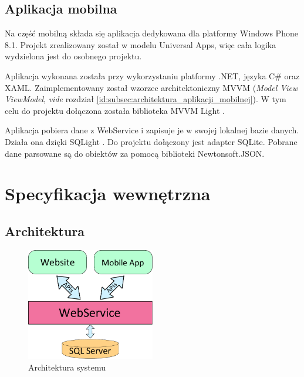 \documentclass[a4paper]{book}
\begin{document}
		\section{Aplikacja mobilna}		
		\label{id:sec:mobile}
		Na część mobilną składa się aplikacja dedykowana dla platformy Windows Phone 8.1. Projekt zrealizowany został w modelu Universal Apps, więc cała logika wydzielona jest do osobnego projektu.
		
		Aplikacja wykonana została przy wykorzystaniu platformy .NET, języka C\# oraz XAML. Zaimplementowany został wzorzec architektoniczny MVVM (\emph{Model View ViewModel}, \emph{vide} rozdział \ref{id:subsec:architektura_aplikacji_mobilnej}). W tym celu do projektu dołączona została biblioteka MVVM Light \cite{id:MVVMLight}. 
		
		Aplikacja pobiera dane z WebService i zapisuje je w swojej lokalnej bazie danych. Działa ona dzięki SQLight \cite{id:SQLite}. Do projektu dołączony jest adapter SQLite. Pobrane dane parsowane są do obiektów za pomocą biblioteki Newtonsoft.JSON.




	\chapter{Specyfikacja wewnętrzna}
	\label{id:cha:specyfikacja_wewnetrzna}
	
		\section{Architektura}
		\label{id:sec:architektura}
		\begin{figure}		
			\centering
			\includegraphics[width=0.5\textwidth]{images/architektura.pdf}
			\caption{Architektura systemu}
			\label{fig:architektura}
		\end{figure}
		
\end{document}
